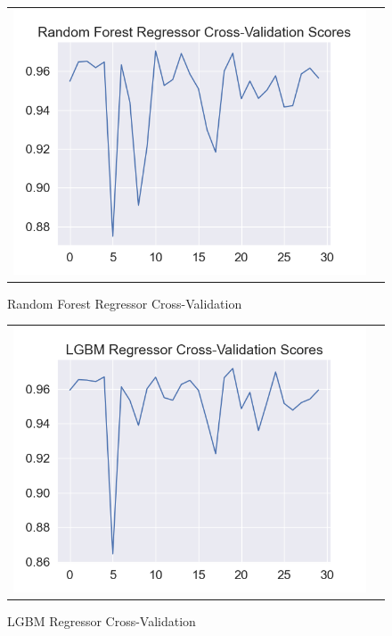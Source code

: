 \documentclass[conference]{IEEEtran}
\begin{document}
\begin{figure}[!h]
	\centering
	\begin{center}
		\begin{tabular}{cc}
			\includegraphics[scale=0.5]{pictures/pic_13.png}&
		\end{tabular}
	\end{center}
	\caption{Random Forest Regressor Cross-Validation}
	\label{fig:13}
\end{figure}
\pagebreak
\begin{figure}[!h]
	\centering
	\begin{center}
		\begin{tabular}{cc}
			\includegraphics[scale=0.5]{pictures/pic_14.png}&
		\end{tabular}
	\end{center}
	\caption{LGBM Regressor Cross-Validation}
	\label{fig:14}
\end{figure}
\end{document}
